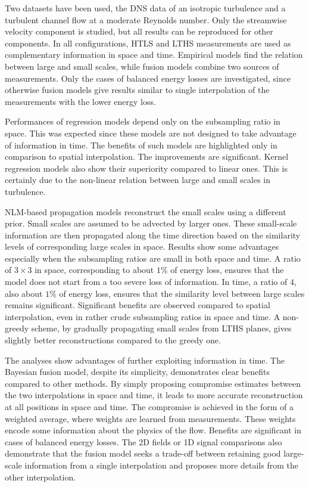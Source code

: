 Two datasets have been used, the DNS data of an isotropic turbulence and a turbulent channel flow at a moderate Reynolds number. Only the streamwise velocity component is studied, but all results can be reproduced for other components. In all configurations, HTLS and LTHS measurements are used as complementary information in space and time. Empirical models find the relation between large and small scales, while fusion models combine two sources of measurements. Only the cases of balanced energy losses are investigated, since otherwise fusion models give results similar to single interpolation of the measurements with the lower energy loss.

Performances of regression models depend only on the subsampling ratio in space. This was expected since these models are not designed to take advantage of information in time. The benefits of such models are highlighted only in comparison to spatial interpolation. The improvements are significant. Kernel regression models also show their superiority compared to linear ones. This is certainly due to the non-linear relation between large and small scales in turbulence.

NLM-based propagation models reconstruct the small scales using a different prior. Small scales are assumed to be advected by larger ones. These small-scale information are then propagated along the time direction based on the similarity levels of corresponding large scales in space. Results show some advantages especially when the subsampling ratios are small in both space and time. A ratio of $ 3 \times 3 $ in space, corresponding to about $ 1\% $ of energy loss, ensures that the model does not start from a too severe loss of information. In time, a ratio of $ 4 $, also about $ 1\% $ of energy loss, ensures that the similarity level between large scales remains significant. Significant benefits are observed compared to spatial interpolation, even in rather crude subsampling ratios in space and time. A non-greedy scheme, by gradually propagating small scales from LTHS planes, gives slightly better reconstructions compared to the greedy one. 

The analyses show advantages of further exploiting information in time. The Bayesian fusion model, despite its simplicity, demonstrates clear benefits compared to other methods. By simply proposing compromise estimates between the two interpolations in space and time, it leads to more accurate reconstruction at all positions in space and time. The compromise is achieved in the form of a weighted average, where weights are learned from measurements. These weights encode some information about the physics of the flow. Benefits are significant in cases of balanced energy losses. The 2D fields or 1D signal comparisons also demonstrate that the fusion model seeks a trade-off between retaining good large-scale information from a single interpolation and proposes more details from the other interpolation.


